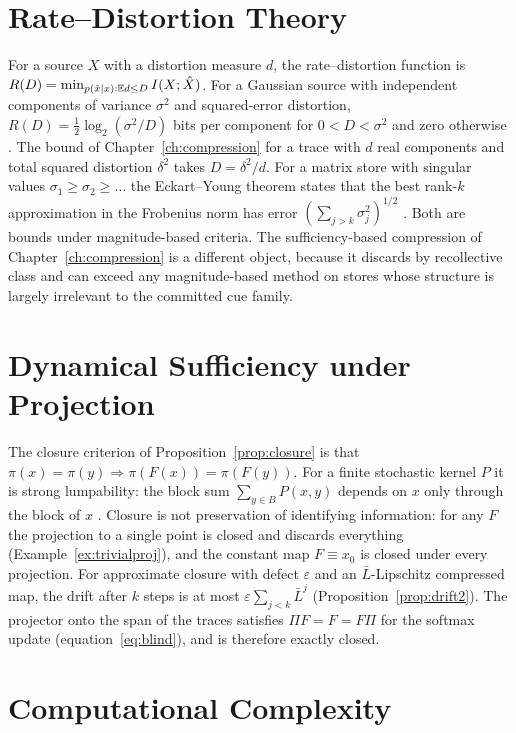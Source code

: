 \chapter{Rate--Distortion Theory}\label{app:rd}

For a source $X$ with a distortion measure $d$, the rate--distortion function is $R(D)=\min_{p(\hat x\mid x):\mathbb{E} d\le D}I(X;\hat X)$. For a Gaussian source with independent components of variance $\sigma^2$ and squared-error distortion, $R(D)=\tfrac12\log_2(\sigma^2/D)$ bits per component for $0<D<\sigma^2$ and zero otherwise \cite{cover2006}. The bound of Chapter~\ref{ch:compression} for a trace with $d$ real components and total squared distortion $\delta^2$ takes $D=\delta^2/d$. For a matrix store with singular values $\sigma_1\ge\sigma_2\ge\dots$ the Eckart--Young theorem states that the best rank-$k$ approximation in the Frobenius norm has error $(\sum_{j>k}\sigma_j^2)^{1/2}$ \cite{eckart1936}. Both are bounds under magnitude-based criteria. The sufficiency-based compression of Chapter~\ref{ch:compression} is a different object, because it discards by recollective class and can exceed any magnitude-based method on stores whose structure is largely irrelevant to the committed cue family.

\chapter{Dynamical Sufficiency under Projection}\label{app:proj}

The closure criterion of Proposition~\ref{prop:closure} is that $\pi(x)=\pi(y)\Rightarrow\pi(F(x))=\pi(F(y))$. For a finite stochastic kernel $P$ it is strong lumpability: the block sum $\sum_{y\in B}P(x,y)$ depends on $x$ only through the block of $x$ \cite{kemeny1960}. Closure is not preservation of identifying information: for any $F$ the projection to a single point is closed and discards everything (Example~\ref{ex:trivialproj}), and the constant map $F\equiv x_0$ is closed under every projection. For approximate closure with defect $\varepsilon$ and an $\bar L$-Lipschitz compressed map, the drift after $k$ steps is at most $\varepsilon\sum_{j<k}\bar L^j$ (Proposition~\ref{prop:drift2}). The projector onto the span of the traces satisfies $\Pi F=F=F\Pi$ for the softmax update (equation~\eqref{eq:blind}), and is therefore exactly closed.

\chapter{Computational Complexity}\label{app:complexity}

